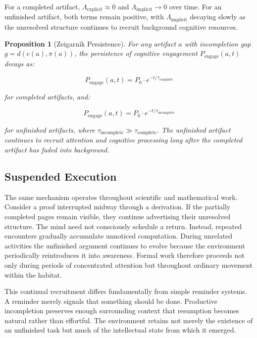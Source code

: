 \documentclass[12pt,oneside]{article}
\newtheorem{proposition}[definition]{Proposition}
\theoremstyle{remark}
\begin{document}
For a completed artifact, $\Lambda_{\text{explicit}} \approx 0$ and $\Lambda_{\text{implicit}} \to 0$ over time. For an unfinished artifact, both terms remain positive, with $\Lambda_{\text{implicit}}$ decaying slowly as the unresolved structure continues to recruit background cognitive resources.

\begin{proposition}[Zeigarnik Persistence]
For any artifact $a$ with incompletion gap $g = d(c(a), \pi(a))$, the persistence of cognitive engagement $P_{\text{engage}}(a, t)$ decays as:

\begin{equation}
P_{\text{engage}}(a, t) = P_0 \cdot e^{-t/\tau_{\text{complete}}}
\end{equation}

for completed artifacts, and:

\begin{equation}
P_{\text{engage}}(a, t) = P_0 \cdot e^{-t/\tau_{\text{incomplete}}}
\end{equation}

for unfinished artifacts, where $\tau_{\text{incomplete}} \gg \tau_{\text{complete}}$. The unfinished artifact continues to recruit attention and cognitive processing long after the completed artifact has faded into background.
\end{proposition}

\subsection{Suspended Execution}

The same mechanism operates throughout scientific and mathematical work. Consider a proof interrupted midway through a derivation. If the partially completed pages remain visible, they continue advertising their unresolved structure. The mind need not consciously schedule a return. Instead, repeated encounters gradually accumulate unnoticed computation. During unrelated activities the unfinished argument continues to evolve because the environment periodically reintroduces it into awareness. Formal work therefore proceeds not only during periods of concentrated attention but throughout ordinary movement within the habitat.

This continual recruitment differs fundamentally from simple reminder systems. A reminder merely signals that something should be done. Productive incompletion preserves enough surrounding context that resumption becomes natural rather than effortful. The environment retains not merely the existence of an unfinished task but much of the intellectual state from which it emerged.
\end{document}
